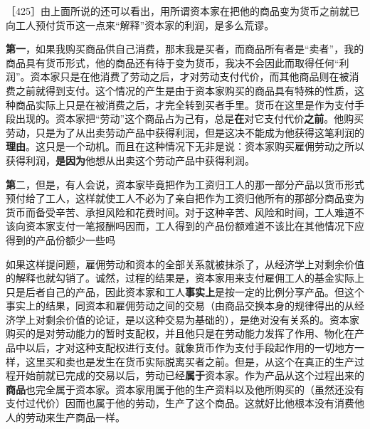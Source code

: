 

［425］\fontbox{~\{}由上面所说的还可以看出，用所谓资本家在把他的商品变为货币之前就已向工人预付货币这一点来“解释”资本家的利润，是多么荒谬。

\textbf{第一}，如果我购买商品供自己消费，那末我是买者，而商品所有者是“卖者”，我的商品具有货币形式，他的商品还有待于变为货币，我决不会因此而取得任何“利润”。资本家只是在他消费了劳动之后，才对劳动支付代价，而其他商品则在被消费之前就得到支付。这个情况的产生是由于资本家购买的商品具有特殊的性质，这种商品实际上只是在被消费之后，才完全转到买者手里。货币在这里是作为支付手段出现的。资本家把“劳动”这个商品占为己有，总是\textbf{在}对它支付代价\textbf{之前}。他购买劳动，只是为了从出卖劳动产品中获得利润，但是这决不能成为他获得这笔利润的\textbf{理由}。这只是一个动机。而且在这种情况下无非是说：资本家购买雇佣劳动之所以获得利润，\textbf{是因为}他想从出卖这个劳动产品中获得利润。

\textbf{第}二，但是，有人会说，资本家毕竟把作为工资归工人的那一部分产品以货币形式预付给了工人，这样就使工人不必为了亲自把作为工资归他所有的那部分商品变为货币而备受辛苦、承担风险和花费时间。对于这种辛苦、风险和时间，工人难道不该向资本家支付一笔报酬吗因而，工人得到的产品份额难道不该比在其他情况下应得到的产品份额少一些吗

如果这样提问题，雇佣劳动和资本的全部关系就被抹杀了，从经济学上对剩余价值的解释也就勾销了。诚然，过程的结果是，资本家用来支付雇佣工人的基金实际上只是后者自己的产品，因此资本家和工人\textbf{事实上}是按一定的比例分享产品。但这个事实上的结果，同资本和雇佣劳动之间的交易（由商品交换本身的规律得出的从经济学上对剩余价值的论证，是以这种交易为基础的），是绝对没有关系的。资本家购买的是对劳动能力的暂时支配权，并且他只是在劳动能力发挥了作用、物化在产品中以后，才对这种支配权进行支付。就象货币作为支付手段起作用的一切地方一样，这里买和卖也是发生在货币实际脱离买者之前。但是，从这个在真正的生产过程开始前就已完成的交易以后，劳动已经\textbf{属于}资本家。作为产品从这个过程出来的\textbf{商品}也完全属于资本家。资本家用属于他的生产资料以及他所购买的（虽然还没有支付过代价）因而也属于他的劳动，生产了这个商品。这就好比他根本没有消费他人的劳动来生产商品一样。

